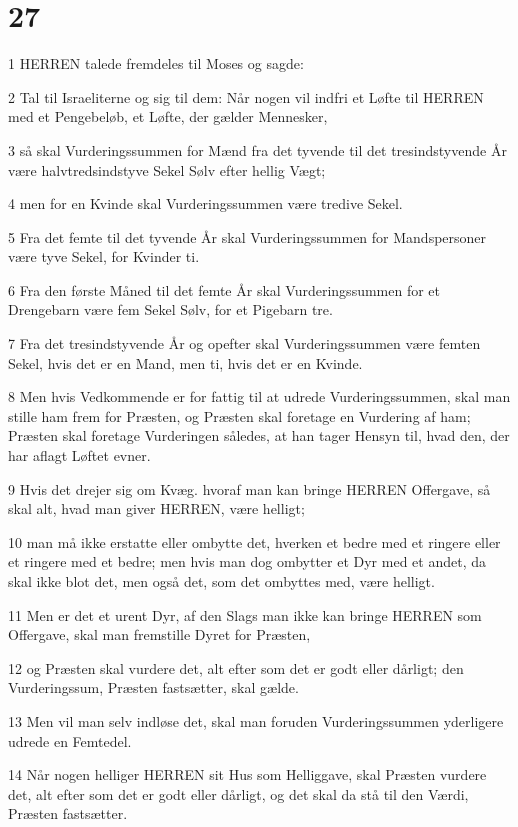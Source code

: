 \chapter{27}

\par 1 HERREN talede fremdeles til Moses og sagde:
\par 2 Tal til Israeliterne og sig til dem: Når nogen vil indfri et Løfte til HERREN med et Pengebeløb, et Løfte, der gælder Mennesker,
\par 3 så skal Vurderingssummen for Mænd fra det tyvende til det tresindstyvende År være halvtredsindstyve Sekel Sølv efter hellig Vægt;
\par 4 men for en Kvinde skal Vurderingssummen være tredive Sekel.
\par 5 Fra det femte til det tyvende År skal Vurderingssummen for Mandspersoner være tyve Sekel, for Kvinder ti.
\par 6 Fra den første Måned til det femte År skal Vurderingssummen for et Drengebarn være fem Sekel Sølv, for et Pigebarn tre.
\par 7 Fra det tresindstyvende År og opefter skal Vurderingssummen være femten Sekel, hvis det er en Mand, men ti, hvis det er en Kvinde.
\par 8 Men hvis Vedkommende er for fattig til at udrede Vurderingssummen, skal man stille ham frem for Præsten, og Præsten skal foretage en Vurdering af ham; Præsten skal foretage Vurderingen således, at han tager Hensyn til, hvad den, der har aflagt Løftet evner.
\par 9 Hvis det drejer sig om Kvæg. hvoraf man kan bringe HERREN Offergave, så skal alt, hvad man giver HERREN, være helligt;
\par 10 man må ikke erstatte eller ombytte det, hverken et bedre med et ringere eller et ringere med et bedre; men hvis man dog ombytter et Dyr med et andet, da skal ikke blot det, men også det, som det ombyttes med, være helligt.
\par 11 Men er det et urent Dyr, af den Slags man ikke kan bringe HERREN som Offergave, skal man fremstille Dyret for Præsten,
\par 12 og Præsten skal vurdere det, alt efter som det er godt eller dårligt; den Vurderingssum, Præsten fastsætter, skal gælde.
\par 13 Men vil man selv indløse det, skal man foruden Vurderingssummen yderligere udrede en Femtedel.
\par 14 Når nogen helliger HERREN sit Hus som Helliggave, skal Præsten vurdere det, alt efter som det er godt eller dårligt, og det skal da stå til den Værdi, Præsten fastsætter.
